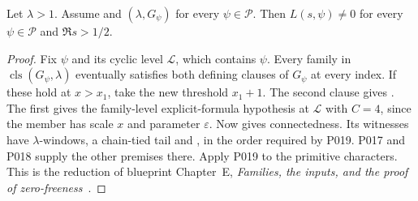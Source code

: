 
\begin{theorem}\label{pn:P016}
Let $\lambda>1$. Assume  and $(\lambda,G_\psi)$ for every $\psi\in\mathcal P$. Then $L(s,\psi)\ne0$ for every $\psi\in\mathcal P$ and $\Re s>1/2$.
\end{theorem}
\begin{proof}
Fix $\psi$ and its cyclic level $\mathcal L$, which contains $\psi$. Every family in $\operatorname{cls}(G_\psi,\lambda)$ eventually satisfies both defining clauses of $G_\psi$ at every index. If these hold at $x>x_1$, take the new threshold $x_1+1$. The second clause gives . The first gives the family-level explicit-formula hypothesis  at $\mathcal L$ with $C=4$, since the member has scale $x$ and parameter $\varepsilon$. Now  gives connectedness. Its witnesses have $\lambda$-windows, a chain-tied tail and , in the order required by P019. P017 and P018 supply the other premises there. Apply P019 to the primitive characters. This is the reduction of blueprint Chapter~E, \emph{Families, the inputs, and the proof of zero-freeness}~.
\end{proof}
